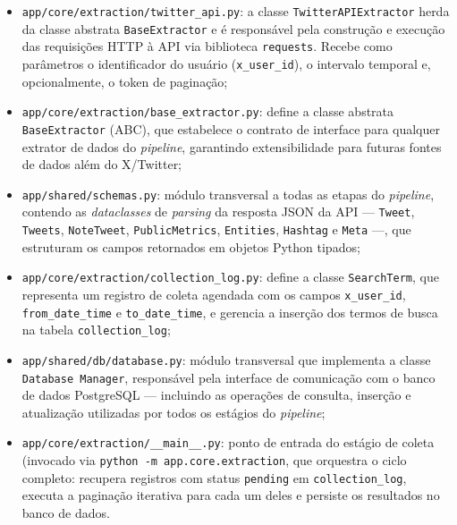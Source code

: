 \begin{itemize}

	\item \texttt{app/core/extraction/twitter\_api.py}: a classe \texttt{TwitterAPIExtractor} herda da classe abstrata \texttt{BaseExtractor} e é responsável pela construção e execução das requisições HTTP à API via biblioteca \texttt{requests}. Recebe como parâmetros o identificador do usuário (\texttt{x\_user\_id}), o intervalo temporal e, opcionalmente, o token de paginação;
	
	\item \texttt{app/core/extraction/base\_extractor.py}: define a classe abstrata \texttt{BaseExtractor} (ABC), que estabelece o contrato de interface para qualquer extrator de dados do \textit{pipeline}, garantindo extensibilidade para futuras fontes de dados além do X/Twitter;
	
	\item \texttt{app/shared/schemas.py}: módulo transversal a todas as etapas do \textit{pipeline}, contendo as \textit{dataclasses} de \textit{parsing} da resposta JSON da API — \texttt{Tweet}, \texttt{Tweets}, \texttt{NoteTweet}, \texttt{PublicMetrics}, \texttt{Entities}, \texttt{Hashtag} e \texttt{Meta} —, que estruturam os campos retornados em objetos Python tipados;
	
	\item \texttt{app/core/extraction/collection\_log.py}: define a classe \texttt{SearchTerm}, que representa um registro de coleta agendada com os campos \texttt{x\_user\_id}, 	\texttt{from\_date\_time} e \texttt{to\_date\_time}, e gerencia a inserção dos termos de busca na tabela \texttt{collection\_log};
	
	\item \texttt{app/shared/db/database.py}: módulo transversal que implementa a classe \texttt{Database Manager}, responsável pela interface de comunicação com o banco de dados PostgreSQL — incluindo as operações de consulta, inserção e atualização utilizadas por todos os estágios do \textit{pipeline};
	
	\item \texttt{app/core/extraction/\_\_main\_\_.py}: ponto de entrada do estágio de coleta (invocado via \texttt{python -m app.core.extraction}, que orquestra o ciclo completo: recupera
	registros com status \texttt{pending} em \texttt{collection\_log}, executa a paginação iterativa para cada um deles e persiste os resultados no banco de dados.
\end{itemize}

